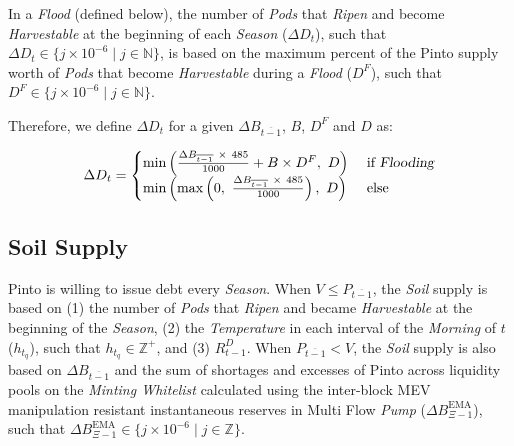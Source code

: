 \documentclass[tikz]{article}
\newcommand{\term}[1]{\textsl{#1}}
\begin{document}
\newpage

In a \term{Flood} (defined below), the number of \term{Pods} that \term{Ripen} and become \term{Harvestable} at the beginning of each \term{Season} ($\Delta D_{t}$), such that $\Delta D_{t} \in \{j \times 10^{-6} \mid j \in \mathbb{N} \}$, is based on the maximum percent of the Pinto supply worth of \term{Pods} that become \term{Harvestable} during a \term{Flood} ($D^{F}$), such that $D^{F} \in \{j \times 10^{-6} \mid j \in \mathbb{N} \}$.

Therefore, we define $\Delta D_{t}$ for a given $\Delta B_{\overline{t-1}}$, $B$, $D^{F}$ and $D$ as:

    $$
        \Delta D_{t} =
            \begin{cases}
               {\text{min}\left(
                    \frac{\Delta B_{\overline{t-1}}\ \times\ 485}
                            {1000} + B \times D^{F},\ 
                        D\right)}\
                    & \text{if } \term{Flooding} \\

               {\text{min}\left(
                    \text{max}\left
                        (0,\ 
                        \frac{\Delta B_{\overline{t-1}}\ \times\ 485}
                                {1000}\right),\ 
                            D\right)}
                    & \text{else }   
            \end{cases}
    $$


\subsection{Soil Supply}

Pinto is willing to issue debt every \term{Season}. When $V \leq P_{\overline{t-1}}$, the \term{Soil} supply is based on (1) the number of \term{Pods} that \term{Ripen} and became \term{Harvestable} at the beginning of the \term{Season}, (2) the \term{Temperature} in each interval of the \term{Morning} of $t$ ($h_{t_{q}}$), such that $h_{t_{q}} \in \mathbb{Z}^{+}$, and (3) $R_{t-1}^{D}$. When $P_{\overline{t-1}} < V$, the \term{Soil} supply is also based on $\Delta B_{\overline{t-1}}$ and the sum of shortages and excesses of Pinto across liquidity pools on the \term{Minting Whitelist} calculated using the inter-block MEV manipulation resistant instantaneous reserves in Multi Flow \term{Pump} ($\Delta B_{\Xi-1}^{\text{EMA}}$), such that $\Delta B_{\Xi-1}^{\text{EMA}} \in \{j \times 10^{-6} \mid j \in \mathbb{Z} \}$.
\end{document}
